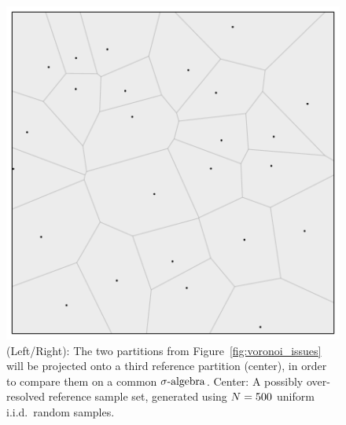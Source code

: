 \begin{figure}[ht]
\begin{minipage}{.4\textwidth}
	\end{minipage}
		\begin{minipage}{.275\textwidth}
		\includegraphics[width=\linewidth]{./images/voronoi_diagram_N25_r10_no_label}
	\end{minipage}
\caption{
(Left/Right): The two partitions from Figure~\ref{fig:voronoi_issues} will be projected onto a third reference partition (center), in order to compare them on a common $\sigma\text{-algebra}$.
Center: A possibly over-resolved reference sample set, generated using $N = 500$ uniform i.i.d.~random samples. 
}
\label{fig:voronoi_sols}
\end{figure}



